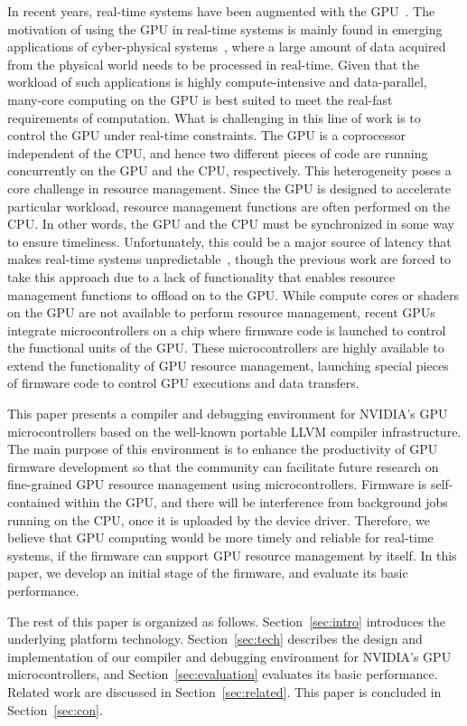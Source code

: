 \par
In recent years, real-time systems have been augmented with
the GPU~\cite{Kato_ATC11, Kato_RTSS11, Kato_RTAS11, Basaran_ECRTS12,
Elliott_ECRTS12, Elliott_RTS12}.
The motivation of using the GPU in real-time systems is mainly found in
emerging applications of cyber-physical systems~\cite{Aumiller_CPSNA12,
McNaughton_ICRA11, Ferreira_JRTIP11}, where a large
amount of data acquired from the physical world needs to be processed in
real-time.
Given that the workload of such applications is highly compute-intensive and
data-parallel, many-core computing on the GPU is best suited to meet the
real-fast requirements of computation.
What is challenging in this line of work is to control the GPU under
real-time constraints.
The GPU is a coprocessor independent of the CPU, and hence two different
pieces of code are running concurrently on the GPU and the CPU, respectively.
This heterogeneity poses a core challenge in resource management.
Since the GPU is designed to accelerate particular workload, resource
management functions are often performed on the CPU.
In other words, the GPU and the CPU must be synchronized in some way to
ensure timeliness.
Unfortunately, this could be a major source of latency that makes
real-time systems unpredictable~\cite{Kato_ATC11}, though the previous
work are forced to take this approach due to a lack of functionality
that enables resource management functions to offload on to the GPU.
While compute cores or shaders on the GPU are not available to perform
resource management, recent GPUs integrate microcontrollers on a chip
where firmware code is launched to control the functional units of the
GPU.
These microcontrollers are highly available to extend the functionality
of GPU resource management, launching special pieces of firmware code to
control GPU executions and data transfers.

\par
This paper presents a compiler and debugging environment for NVIDIA's
GPU microcontrollers based on the well-known portable LLVM compiler
infrastructure.
The main purpose of this environment is to enhance the productivity of
GPU firmware development so that the community can facilitate future
research on fine-grained GPU resource management using microcontrollers.
Firmware is self-contained within the GPU, and there will be
interference from background jobs running on the CPU, once it is
uploaded by the device driver.
Therefore, we believe that GPU computing would be more timely and
reliable for real-time systems, if the firmware can support GPU resource
management by itself.
In this paper, we develop an initial stage of the firmware, and evaluate
its basic performance.

\par
The rest of this paper is organized as follows.
Section~\ref{sec:intro} introduces the underlying platform technology.
Section~\ref{sec:tech} describes the design and implementation of our
compiler and debugging environment for NVIDIA's GPU microcontrollers,
and Section~\ref{sec:evaluation} evaluates its basic performance.
Related work are discussed in Section~\ref{sec:related}.
This paper is concluded in Section~\ref{sec:con}.
